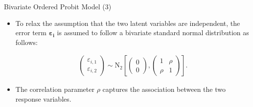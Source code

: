 \documentclass[12pt]{beamer}
\newcommand{\bpm}{\begin{pmatrix}}
\newcommand{\epm}{\end{pmatrix}}
\begin{document}
\begin{frame}{Bivariate Ordered Probit Model  (3)}
\begin{itemize}
\item To relax the assumption that the two latent variables are independent, the error term $\bm{\varepsilon_{i}}$ is assumed to follow a bivariate standard normal distribution as follows:

\begin{align}
  \bpm \varepsilon_{i,1} \\ \varepsilon_{i,2}  \epm \sim \text{N}_{2} \left[ \bpm 0 \\ 0  \epm, \bpm 1 & \rho \\ \rho & 1 \epm \right].
\end{align} 
\item The correlation parameter $\rho$ captures the association between the two response variables.
\end{itemize}
\end{frame}
\end{document}
